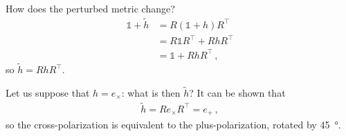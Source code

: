 \documentclass[main.tex]{subfiles}
\begin{document}
How does the perturbed metric change? 
%
\begin{align}
\mathbb{1} + \widetilde{h} &= R (\mathbb{1} + h) R^{\top}  \\
&= R \mathbb{1} R^{\top} + R h R^{\top}  \\
&= \mathbb{1} + R h R^{\top} 
\,,
\end{align}
%
so \(\widetilde{h} = R h R^{\top}\). 

Let us suppose that \(h = e_{ \times }\): what is then \(\widetilde{h}\)? It can be shown that 
%
\begin{align}
\widetilde{h} = R e_{ \times } R^{\top} = e_{+}
\,,
\end{align}
%
so the cross-polarization is equivalent to the plus-polarization, rotated by \SI{45}{\degree}. 
\end{document}
